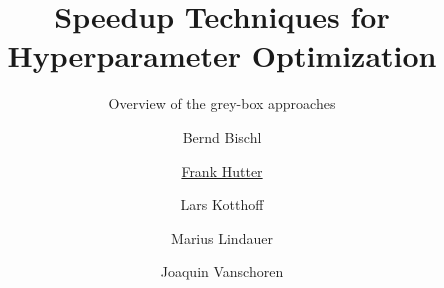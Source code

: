 %


%


\title[AutoML: Grey-box Approaches]{Speedup Techniques for Hyperparameter Optimization} %
\subtitle{Overview of the grey-box approaches} %
\author[Marius Lindauer]{Bernd Bischl \and \underline{Frank Hutter} \and Lars Kotthoff\newline \and Marius Lindauer \and Joaquin Vanschoren}
\institute{}
\date{}




	
	\maketitle


	








